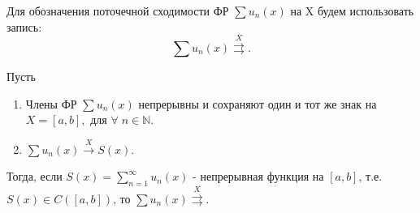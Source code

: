 \begin{col-answer-preambule}
	Для обозначения поточечной сходимости ФР $\sum u_n(x)$ на X будем использовать запись:
	\begin{equation}
	\label{eq:lecture01-14}
	\sum u_n(x) \overset{X}{\rightrightarrows}.
	\end{equation}
\end{col-answer-preambule}
\begin{theorem}
	Пусть
	\begin{enumerate}
		\item Члены ФР $\sum u_n(x)$ непрерывны и сохраняют один и тот же знак на $X = [a, b], \text{ для } \forall \; n \in \mathbb{N}$.
		\item $\sum u_n(x) \overset{X}{\to} S(x)$.
	\end{enumerate}
	Тогда, если $S(x) = \sum\limits_{n=1}^{\infty} u_n (x)$ - непрерывная функция на $[a, b]$, т.е. $S(x) \in C([a, b])$, то $\sum u_n(x) \overset{X}{\rightrightarrows}$.
\end{theorem}
